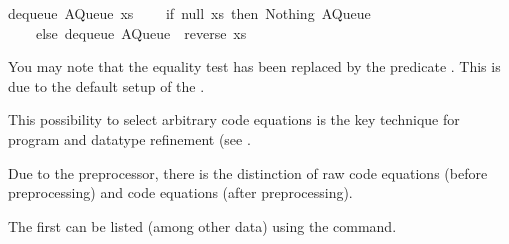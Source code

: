 \begin{isabellebody}
\begin{isamarkuptext}
\begin{typewriter}
dequeue\ {\isacharparenleft}AQueue\ xs\ {\isacharbrackleft}{\isacharbrackright}{\isacharparenright}\ {\isacharequal}\isanewline
\ \ {\isacharparenleft}if\ null\ xs\ then\ {\isacharparenleft}Nothing{\isacharcomma}\ AQueue\ {\isacharbrackleft}{\isacharbrackright}\ {\isacharbrackleft}{\isacharbrackright}{\isacharparenright}\isanewline
\ \ \ \ else\ dequeue\ {\isacharparenleft}AQueue\ {\isacharbrackleft}{\isacharbrackright}\ {\isacharparenleft}reverse\ xs{\isacharparenright}{\isacharparenright}{\isacharparenright}{\isacharsemicolon}
  \end{typewriter}%
\end{isamarkuptext}%
\isamarkuptrue%
%
\endisatagquote
{\isafoldquote}%
%
\isadelimquote
%
\endisadelimquote
%
\begin{isamarkuptext}%
\noindent You may note that the equality test  has
  been replaced by the predicate .  This is due
  to the default setup of the .

  This possibility to select arbitrary code equations is the key
  technique for program and datatype refinement (see
  .

  Due to the preprocessor, there is the distinction of raw code
  equations (before preprocessing) and code equations (after
  preprocessing).

  The first can be listed (among other data) using the \hypertarget{command.print-codesetup}{\hyperlink{command.print-codesetup}{\mbox{}}} command.


\end{isamarkuptext}
\end{isabellebody}
